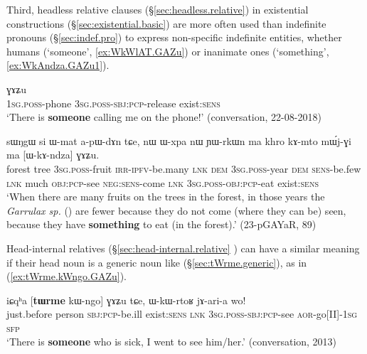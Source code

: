 Third, headless relative clauses (§\ref{sec:headless.relative}) in existential constructions (§\ref{sec:existential.basic}) are more often used than indefinite pronouns (§\ref{sec:indef.pro}) to express non-specific indefinite entities, whether humans (`someone', \ref{ex:WkWlAT.GAZu}) or inanimate ones  (`something', \ref{ex:WkAndza.GAZu1}).

\begin{exe}
\ex \label{ex:WkWlAT.GAZu}
 ɣɤʑu \\
 \textsc{1sg}.\textsc{poss}-phone \textsc{3sg}.\textsc{poss}-\textsc{sbj}:\textsc{pcp}-release exist:\textsc{sens} \\
\glt `There is \textbf{someone} calling me on the phone!' (conversation, 22-08-2018)
\end{exe}

\begin{exe}
\ex \label{ex:WkAndza.GAZu1}
\gll sɯŋgɯ si ɯ-mat a-pɯ-dɤn tɕe, nɯ ɯ-xpa nɯ ɲɯ-rkɯn ma khro kɤ-mto mɯ́j-ɣi ma [ɯ-kɤ-ndza] ɣɤʑu. \\
forest tree \textsc{3sg}.\textsc{poss}-fruit \textsc{irr}-\textsc{ipfv}-be.many \textsc{lnk} \textsc{dem} \textsc{3sg}.\textsc{poss}-year \textsc{dem} \textsc{sens}-be.few \textsc{lnk} much \textsc{obj}:\textsc{pcp}-see \textsc{neg}:\textsc{sens}-come \textsc{lnk} \textsc{3sg}.\textsc{poss}-\textsc{obj}:\textsc{pcp}-eat exist:\textsc{sens} \\
\glt `When there are many fruits on the trees in the forest, in those years the \textit{Garrulax sp.} () are fewer because they do not come (where they can be) seen, because they have \textbf{something} to eat (in the forest).' (23-pGAYaR, 89)
\end{exe}

Head-internal relatives (§\ref{sec:head-internal.relative} ) can have a similar meaning if their head noun is a generic noun like  (§\ref{sec:tWrme.generic}), as in (\ref{ex:tWrme.kWngo.GAZu}).

\begin{exe}
\ex \label{ex:tWrme.kWngo.GAZu}
\gll  iɕqʰa [\textbf{tɯrme} kɯ-ngo] ɣɤʑu tɕe, ɯ-kɯ-rtoʁ jɤ-ari-a wo! \\
just.before person \textsc{sbj}:\textsc{pcp}-be.ill exist:\textsc{sens} \textsc{lnk} \textsc{3sg}.\textsc{poss}-\textsc{sbj}:\textsc{pcp}-see \textsc{aor}-go[II]-\textsc{1sg} \textsc{sfp} \\
\glt `There is \textbf{someone} who is sick, I went to see him/her.' (conversation, 2013)
\end{exe}

